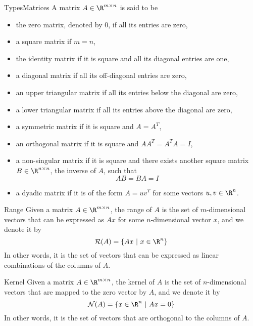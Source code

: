 \begin{ex}{TypesMatrices}
    A matrix $A \in \R^{m \times n}$ is said to be
    \begin{itemize}
        \item 
            the zero matrix, denoted by $0$, if all its entries are zero,
        \item 
            a square matrix if $m = n$,
        \item 
            the identity matrix if it is square and all its diagonal entries are one,
        \item 
            a diagonal matrix if all its off-diagonal entries are zero,
        \item 
            an upper triangular matrix if all its entries below the diagonal are zero,
        \item 
            a lower triangular matrix if all its entries above the diagonal are zero,
        \item
            a symmetric matrix if it is square and $A = A^T$,
        \item 
            an orthogonal matrix if it is square and $AA^T = A^T A = I$,
        \item 
            a non-singular matrix if it is square and there exists another square matrix $B \in \R^{n \times n}$, the inverse of $A$, such that 
            \begin{equation*}
                AB = BA = I
            \end{equation*} 
        \item 
            a dyadic matrix if it is of the form $A = uv^T$ for some vectors $u, v \in \R^n$.
    \end{itemize}
\end{ex}

\begin{theo}[Range]{Range}
    Given a matrix $A \in \R^{m \times n}$, the range of $A$ is the set of $m$-dimensional vectors that can be expressed as $Ax$ for some $n$-dimensional vector $x$, and we denote it by 
    \begin{equation*}
        \mathcal{R}(A) = \{ Ax \ | \ x \in \R^n \}
    \end{equation*}
    In other words, it is the set of vectors that can be expressed as linear combinations of the columns of $A$.
\end{theo}

\begin{theo}[Kernel]{Kernel}
    Given a matrix $A \in \R^{m \times n}$, the kernel of $A$ is the set of $n$-dimensional vectors that are mapped to the zero vector by $A$, and we denote it by
    \begin{equation*}
        \mathcal{N}(A) = \{ x \in \R^n \ | \ Ax = 0 \}
    \end{equation*}
    In other words, it is the set of vectors that are orthogonal to the columns of $A$.
\end{theo}

